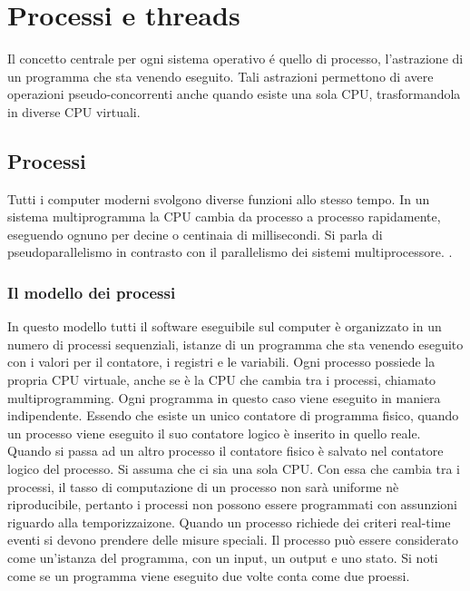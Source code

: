 \chapter{Processi e threads}
Il concetto centrale per ogni sistema operativo \'e quello di processo, l'astrazione di un programma che sta venendo eseguito. Tali astrazioni permettono
di avere operazioni pseudo-concorrenti anche quando esiste una sola CPU, trasformandola in diverse CPU virtuali.
\section{Processi}
Tutti i computer moderni svolgono diverse funzioni allo stesso tempo. In un sistema multiprogramma la CPU cambia da processo a processo rapidamente,
eseguendo ognuno per decine o centinaia di millisecondi. Si parla di pseudoparallelismo in contrasto con il parallelismo dei sistemi multiprocessore. .
\subsection{Il modello dei processi}
In questo modello tutti il software eseguibile sul computer \`e organizzato in un numero di processi sequenziali, istanze di un programma che sta venendo eseguito con i valori per
il contatore, i registri e le variabili. Ogni processo possiede la propria CPU virtuale, anche se \`e la CPU che cambia tra i processi, chiamato multiprogramming. Ogni programma in
questo caso viene eseguito in maniera indipendente. Essendo che esiste un unico contatore di programma fisico, quando un processo viene eseguito il suo contatore logico \`e inserito
in quello reale. Quando si passa ad un altro processo il contatore fisico \`e salvato nel contatore logico del processo. Si assuma che ci sia una sola CPU. Con essa che cambia tra i
processi, il tasso di computazione di un processo non sar\`a uniforme n\`e riproducibile, pertanto i processi non possono essere programmati con assunzioni riguardo alla temporizzaizone.
Quando un processo richiede dei criteri real-time eventi si devono prendere delle misure speciali. Il processo pu\`o essere considerato come un'istanza del programma, con un input, un
output e uno stato. Si noti come se un programma viene eseguito due volte conta come due proessi.
